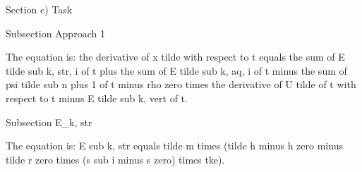 Section c) Task

Subsection Approach 1

The equation is: the derivative of x tilde with respect to t equals the sum of E tilde sub k, str, i of t plus the sum of E tilde sub k, aq, i of t minus the sum of psi tilde sub n plus 1 of t minus rho zero times the derivative of U tilde of t with respect to t minus E tilde sub k, vert of t.

Subsection E_k, str

The equation is: E sub k, str equals tilde m times (tilde h minus h zero minus tilde r zero times (s sub i minus s zero) times tke).